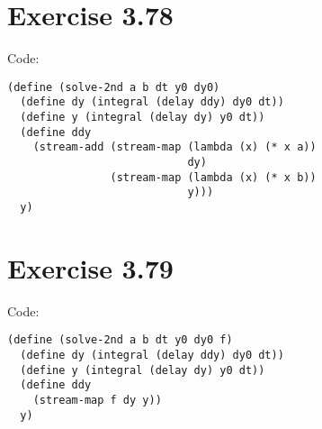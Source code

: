 \documentclass[../main.tex]{subfiles}
\begin{document}
\section{Exercise 3.78}

Code:

\begin{lstlisting}
(define (solve-2nd a b dt y0 dy0)
  (define dy (integral (delay ddy) dy0 dt))
  (define y (integral (delay dy) y0 dt))
  (define ddy
    (stream-add (stream-map (lambda (x) (* x a))
                            dy)
                (stream-map (lambda (x) (* x b))
                            y)))
  y)
\end{lstlisting}

\section{Exercise 3.79}

Code:

\begin{lstlisting}
(define (solve-2nd a b dt y0 dy0 f)
  (define dy (integral (delay ddy) dy0 dt))
  (define y (integral (delay dy) y0 dt))
  (define ddy
    (stream-map f dy y))
  y)
\end{lstlisting}
\end{document}
